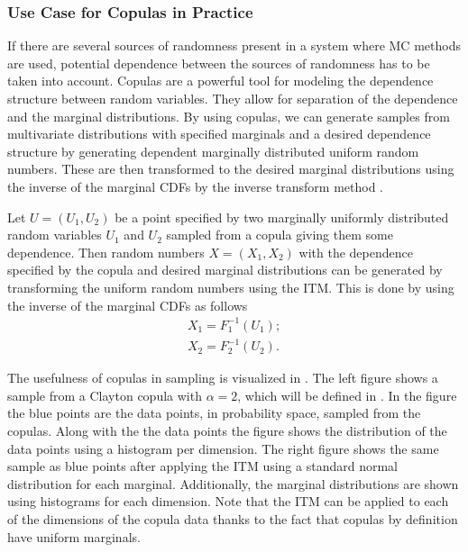 \subsubsection{Use Case for Copulas in Practice}\label{sec:CopulaUseCase}
If there are several sources of randomness present in a system where \gls{MC} methods are used, potential dependence between the sources of randomness has to be taken into account. Copulas are a powerful tool for modeling the dependence structure between random variables. They allow for separation of the dependence and the marginal distributions. By using copulas, we can generate samples from multivariate distributions with specified marginals and a desired dependence structure by generating dependent marginally distributed uniform random numbers. These are then transformed to the desired marginal distributions using the inverse of the marginal \gls{CDF}s by the inverse transform method .

Let $U = (U_1,U_2)$ be a point specified by two marginally uniformly distributed random variables $U_1$ and $U_2$ sampled from a copula giving them some dependence. Then random numbers $X = (X_1,X_2)$ with the dependence specified by the copula and desired marginal distributions can be generated by transforming the uniform random numbers using the \gls{ITM}. This is done by using the inverse of the marginal \gls{CDF}s as follows
\begin{align*}
    X_1 = F_1^{-1}(U_1); \\
    X_2 = F_2^{-1}(U_2).
\end{align*}

The usefulness of copulas in sampling is visualized in . The left figure shows a sample from a Clayton copula with $\alpha = 2$, which will be defined in . In the figure the blue points are the data points, in probability space, sampled from the copulas. Along with the the data points the figure shows the distribution of the data points using a histogram per dimension. The right figure shows the same sample as blue points after applying the \gls{ITM} using a standard normal distribution for each marginal. Additionally, the marginal distributions are shown using histograms for each dimension. Note that the \gls{ITM} can be applied to each of the dimensions of the copula data thanks to the fact that copulas by definition have uniform marginals. 

